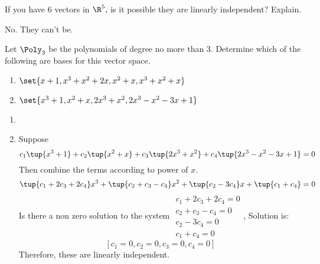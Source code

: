 \begin{enumialphparenastyle}
\begin{ex} If you have $6$ vectors in $\R^{5},$ is it possible they are
linearly independent? Explain. 
\begin{sol}
No. They can't be.
\end{sol}
\end{ex}

\begin{ex} Let $\Poly_3$ be the polynomials of degree no more than 3. Determine which
of the following are bases for this vector space.

\begin{enumerate}
\item $\set{x+1,x^{3}+x^{2}+2x,x^{2}+x,x^{3}+x^{2}+x} $

\item $\set{x^{3}+1,x^{2}+x,2x^{3}+x^{2},2x^{3}-x^{2}-3x+1} $
\end{enumerate}

\begin{sol}
\begin{enumerate}
\item 
\item
Suppose
\[
c_{1}\tup{x^{3}+1} +c_{2}\tup{x^{2}+x} +c_{3}\tup{
2x^{3}+x^{2}} +c_{4}\tup{2x^{3}-x^{2}-3x+1} =0
\]
Then combine the terms according to power of $x.$
\[
\tup{c_{1}+2c_{3}+2c_{4}} x^{3}+\tup{c_{2}+c_{3}-c_{4}}
x^{2}+\tup{c_{2}-3c_{4}} x+\tup{c_{1}+c_{4}} =0
\]
Is there a non zero solution to the system $
\begin{array}{c}
c_{1}+2c_{3}+2c_{4}=0 \\
c_{2}+c_{3}-c_{4}=0 \\
c_{2}-3c_{4}=0 \\
c_{1}+c_{4}=0
\end{array}
$, Solution is:
\[
\left[ c_{1}=0,c_{2}=0,c_{3}=0,c_{4}=0\right]
\]
Therefore, these are linearly independent.
\end{enumerate}
\end{sol}
\end{ex}


\end{enumialphparenastyle}
